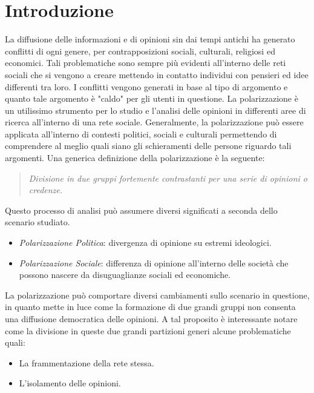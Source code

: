 \chapter{Introduzione}
\label{Introduzione}



La diffusione delle informazioni e di opinioni sin dai tempi antichi ha generato conflitti di ogni genere, per contrapposizioni sociali, culturali, religiosi ed economici. Tali problematiche sono sempre più evidenti all'interno delle reti sociali che si vengono a creare mettendo in contatto individui con pensieri ed idee differenti tra loro. I conflitti vengono generati in base al tipo di argomento e quanto tale argomento è "caldo" per gli utenti in questione. 
La polarizzazione è un utilissimo strumento per lo studio e l'analisi delle opinioni in differenti aree di ricerca all'interno di una rete sociale. Generalmente, la polarizzazione può essere applicata all'interno di contesti politici, sociali e culturali permettendo di comprendere al meglio quali siano  gli schieramenti delle persone riguardo tali argomenti. Una generica definizione della polarizzazione è la seguente:
\begin{quote} 
\textit{Divisione in due gruppi fortemente contrastanti per una serie di opinioni o credenze.}
\end{quote}
Questo processo di analisi può assumere diversi significati a seconda dello scenario studiato. 
\begin{itemize}
\item \textit{Polarizzazione Politica}: divergenza di opinione su estremi ideologici.
\item \textit{Polarizzazione Sociale}: differenza di opinione all'interno delle società che possono nascere da disuguaglianze sociali ed economiche.

\end{itemize}

La polarizzazione può comportare diversi cambiamenti sullo scenario in questione, in quanto mette in luce come la formazione di due grandi gruppi non consenta una diffusione democratica delle opinioni. A tal proposito è interessante notare come la divisione in queste due grandi partizioni generi alcune problematiche quali:
\begin{itemize}
\item La frammentazione della rete stessa.
\item L'isolamento delle opinioni. 
\end{itemize} 

